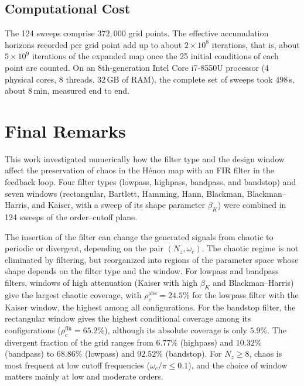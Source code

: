 \documentclass[journal]{IEEEtran}
\begin{document}
\subsection{Computational Cost}\label{sub:cost}
The 124 sweeps comprise $372{,}000$ grid points. The effective accumulation
horizons recorded per grid point add up to about $2\times10^{8}$ iterations,
that is, about $5\times10^{9}$ iterations of the expanded map once the 25
initial conditions of each point are counted. On an 8th-generation Intel Core
i7-8550U processor (4 physical cores, 8 threads, 32\,GB of RAM), the complete
set of sweeps took $498$\,s, about $8$\,min, measured end to end.

\section{Final Remarks}\label{sec:conclusion}
This work investigated numerically how the filter type and the design window
affect the preservation of chaos in the H\'enon map with an FIR filter in the
feedback loop. Four filter types (lowpass, highpass, bandpass, and bandstop)
and seven windows (rectangular, Bartlett, Hamming, Hann, Blackman,
Blackman--Harris, and Kaiser, with a sweep of its shape parameter $\beta_K$)
were combined in 124 sweeps of the order--cutoff plane.

The insertion of the filter can change the generated signals from chaotic to
periodic or divergent, depending on the pair $(N_z,\omega_c)$. The chaotic
regime is not eliminated by filtering, but reorganized into regions of the
parameter space whose shape depends on the filter type and the window. For
lowpass and bandpass filters, windows of high attenuation (Kaiser with high
$\beta_K$ and Blackman--Harris) give the largest chaotic coverage, with
$\rho_c^{\text{abs}}=24.5\%$ for the lowpass filter with the Kaiser window,
the highest among all configurations. For the bandstop filter, the rectangular
window gives the highest conditional coverage among its configurations
($\rho_c^{\text{fin}}=65.2\%$),
although its absolute coverage is only $5.9\%$. The divergent fraction of the
grid ranges from $6.77\%$ (highpass) and $10.32\%$ (bandpass) to $68.86\%$
(lowpass) and $92.52\%$ (bandstop). For $N_z\ge8$, chaos is most frequent
at low cutoff frequencies ($\omega_c/\pi\le0.1$), and the choice of window
matters mainly at low and moderate orders.
\end{document}
